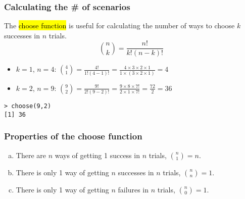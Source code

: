 \documentclass[slidestop,compress,mathserif]{beamer}
\begin{document}

\begin{frame}[fragile]
\frametitle{Calculating the \# of scenarios}

{
The \hl{choose function} is useful for calculating the number of ways to choose $k$ successes in $n$ trials.
\[ {n \choose k} = \frac{n!}{k! (n - k)!} \]
}

\pause

\begin{itemize}

\item $k = 1$, $n = 4$: ${4 \choose 1} = \frac{4!}{1! (4 - 1)!} = \frac{4 \times 3 \times 2 \times 1}{1 \times (3 \times 2 \times 1)} = 4$

\pause

\item $k = 2$, $n = 9$: ${9 \choose 2} = \frac{9!}{2! (9 - 2)!} = \frac{9 \times 8 \times 7!}{2 \times 1 \times 7!} = \frac{72}{2} = 36$

\end{itemize}

\vfill

\begin{beamerboxesrounded}[shadow = true, lower = code body]{}
{\small
\begin{verbatim}
> choose(9,2)
[1] 36
\end{verbatim}
}
\end{beamerboxesrounded}

\end{frame}


\begin{frame}[fragile]
\frametitle{Properties of the choose function}


\begin{enumerate}[(a)]
\item There are $n$ ways of getting 1 success in $n$ trials, ${n \choose 1} = n$.
\item There is only 1 way of getting $n$ successes in $n$ trials, ${n \choose n} = 1$.
\item There is only 1 way of getting $n$ failures in $n$ trials, ${n \choose 0} = 1$.
\end{enumerate}

\end{frame}
\end{document}
